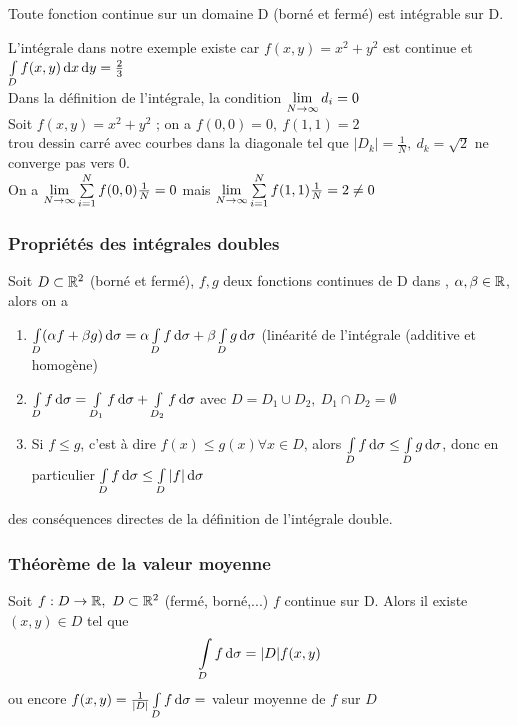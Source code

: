 \documentclass[12pt,a4paper]{article}
\begin{document}
\begin{boite}
	 Toute fonction continue sur un domaine D (borné et fermé) est intégrable sur D.
\end{boite}
L'intégrale dans notre exemple existe car $f(x,y) = x^2 + y^2$ est continue et $\int\limits_D f(x,y) \deriv{x}\deriv{y} = \frac{2}{3}$\\
 Dans la définition de l'intégrale, la condition $\limite{N\to \infty} d_i = 0$\\
Soit $f(x,y) = x^2+y^2$ ; on a $f(0,0) = 0,\ f(1,1) = 2$\\
{trou dessin carré avec courbes dans la diagonale} tel que $|D_k| = \frac{1}{N},\ d_k = \sqrt{2}$ ne converge pas vers 0.\\
On a $\limite{N\to \infty} \somme{N}{i=1}f(0,0) \frac{1}{N} = 0$ mais $\limite{N\to \infty} \somme{N}{i=1} f(1,1) \frac{1}{N} = 2 \neq 0$

\subsubsection{Propriétés des intégrales doubles}
\begin{boite}
 Soit $D\subset \R^2$ (borné et fermé), $f,g$ deux fonctions continues de D dans \R, $\alpha,\beta \in \R$, alors on a 
\begin{enumerate}
	\item 	$\int\limits_D (\alpha f + \beta g) \deriv{\sigma} = \alpha \int\limits_D f \deriv{\sigma} + \beta \int\limits_D g \deriv{\sigma}$ (linéarité de l'intégrale (additive et homogène)
	\item 	$\int\limits_D f \deriv{\sigma} = \int\limits_{D_1} f \deriv{\sigma} + \int\limits_{D_2} f \deriv{\sigma}$ avec $D = D_1 \cup D_2,\ D_1\cap D_2 = \emptyset$
	\item 	Si $f \leq g$, c'est à dire $f(x) \leq g(x) \forall x \in D$, alors $\int\limits_D f \deriv{\sigma} \leq \int\limits_D g \deriv{\sigma}$, donc en particulier $\int\limits_D f \deriv{\sigma} \leq \int\limits_D |f| \deriv{\sigma}$
\end{enumerate}
\end{boite}
 des conséquences directes de la définition de l'intégrale double.

\subsubsection{Théorème de la valeur moyenne}
\begin{boite}
	 Soit $f: D\to \R,\ D\subset \R^2$ (fermé, borné,...) $f$ continue sur D. Alors il existe $(x,y) \in D$ tel que 
	\begin{equation*}
		\int\limits_D f \deriv{\sigma} = |D| f(x,y)	
	\end{equation*}	 
	ou encore $f(x,y) = \frac{1}{|D|}\int\limits_D f \deriv{\sigma} =$ valeur moyenne de $f$ sur $D$
\end{boite}
\end{document}
